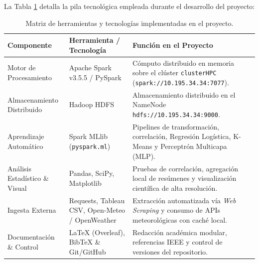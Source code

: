 La Tabla \ref{tab:tecnologias} detalla la pila tecnológica empleada durante el desarrollo del proyecto:

\begin{table}[H]
\centering
\small
\renewcommand{\arraystretch}{1.25}
\begin{tabularx}{\textwidth}{p{3.8cm} p{4.2cm} X}
\toprule
\textbf{Componente} & \textbf{Herramienta / Tecnología} & \textbf{Función en el Proyecto} \\
\midrule
Motor de Procesamiento & Apache Spark v3.5.5 / PySpark & Cómputo distribuido en memoria sobre el clúster \texttt{clusterHPC} (\texttt{spark://10.195.34.34:7077}). \\
Almacenamiento Distribuido & Hadoop HDFS & Almacenamiento distribuido en el NameNode \texttt{hdfs://10.195.34.34:9000}. \\
Aprendizaje Automático & Spark MLlib (\texttt{pyspark.ml}) & Pipelines de transformación, correlación, Regresión Logística, K-Means y Perceptrón Multicapa (MLP). \\
Análisis Estadístico \& Visual & Pandas, SciPy, Matplotlib & Pruebas de correlación, agregación local de resúmenes y visualización científica de alta resolución. \\
Ingesta Externa & Requests, Tableau CSV, Open-Meteo / OpenWeather & Extracción automatizada vía \textit{Web Scraping} y consumo de APIs meteorológicas con caché local. \\
Documentación \& Control & \LaTeX{} (Overleaf), BibTeX \& Git/GitHub & Redacción académica modular, referencias IEEE y control de versiones del repositorio. \\
\bottomrule
\end{tabularx}
\caption{Matriz de herramientas y tecnologías implementadas en el proyecto.}
\label{tab:tecnologias}
\end{table}

